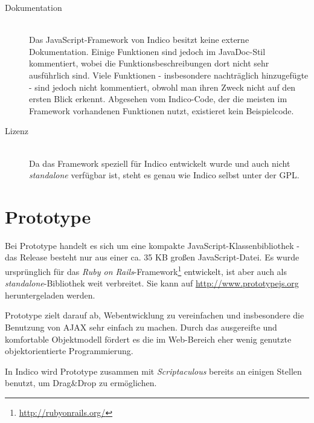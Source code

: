 \begin{description}
\item[Dokumentation] \hfill \\
Das JavaScript-Framework von Indico besitzt keine externe Dokumentation. Einige Funktionen sind
jedoch im JavaDoc-Stil kommentiert, wobei die Funktionsbeschreibungen dort nicht sehr ausführlich
sind. Viele Funktionen - insbesondere nachträglich hinzugefügte - sind jedoch nicht kommentiert,
obwohl man ihren Zweck nicht auf den ersten Blick erkennt. Abgesehen vom Indico-Code, der die
meisten im Framework vorhandenen Funktionen nutzt, existieret kein Beispielcode.

\item[Lizenz] \hfill \\
Da das Framework speziell für Indico entwickelt wurde und auch nicht \emph{standalone} verfügbar
ist, steht es genau wie Indico selbst unter der GPL.
\end{description}





\section{Prototype}
Bei Prototype handelt es sich um eine kompakte JavaScript-Klassenbibliothek - das Release
besteht nur aus einer ca. 35 KB großen JavaScript-Datei. Es wurde ursprünglich für das \emph{Ruby on
Rails}-Framework\footnote{\href{http://rubyonrails.org/}{http://rubyonrails.org/}} entwickelt, ist
aber auch als \emph{standalone}-Bibliothek weit verbreitet. Sie kann auf
\href{http://www.prototypejs.org}{http://www.prototypejs.org} heruntergeladen werden.

Prototype zielt darauf ab, Webentwicklung zu vereinfachen und insbesondere die Benutzung von AJAX
sehr einfach zu machen. Durch das ausgereifte und komfortable Objektmodell fördert es die im
Web-Bereich eher wenig genutzte objektorientierte Programmierung.

In Indico wird Prototype zusammen mit \emph{Scriptaculous} bereits an einigen Stellen benutzt, um
Drag\&Drop zu ermöglichen.


